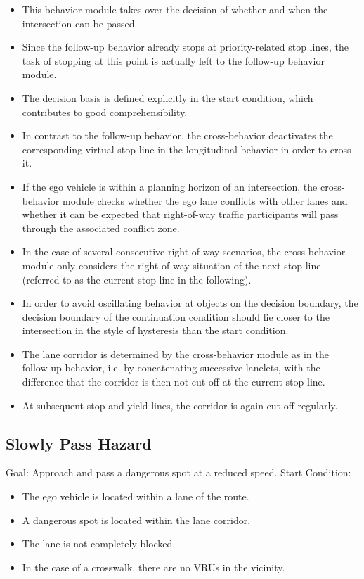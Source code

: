 \begin{itemize}
    \item This behavior module takes over the decision of whether and when the intersection can be passed.
    \item Since the follow-up behavior already stops at priority-related stop lines, the task of stopping at this point is actually left to the follow-up behavior module.
    \item The decision basis is defined explicitly in the start condition, which contributes to good comprehensibility.
    \item In contrast to the follow-up behavior, the cross-behavior deactivates the corresponding virtual stop line in the longitudinal behavior in order to cross it.
    \item If the ego vehicle is within a planning horizon of an intersection, the cross-behavior module checks whether the ego lane conflicts with other lanes and whether it can be expected that right-of-way traffic participants will pass through the associated conflict zone.
    \item In the case of several consecutive right-of-way scenarios, the cross-behavior module only considers the right-of-way situation of the next stop line (referred to as the current stop line in the following).
    \item In order to avoid oscillating behavior at objects on the decision boundary, the decision boundary of the continuation condition should lie closer to the intersection in the style of hysteresis than the start condition.
    \item The lane corridor is determined by the cross-behavior module as in the follow-up behavior, i.e. by concatenating successive lanelets, with the difference that the corridor is then not cut off at the current stop line.
    \item At subsequent stop and yield lines, the corridor is again cut off regularly.
\end{itemize}

\subsection{Slowly Pass Hazard}

    Goal: Approach and pass a dangerous spot at a reduced speed.
    Start Condition:

\begin{itemize}
    \item The ego vehicle is located within a lane of the route.
    \item A dangerous spot is located within the lane corridor.
    \item The lane is not completely blocked.
    \item In the case of a crosswalk, there are no VRUs in the vicinity.
\end{itemize}

